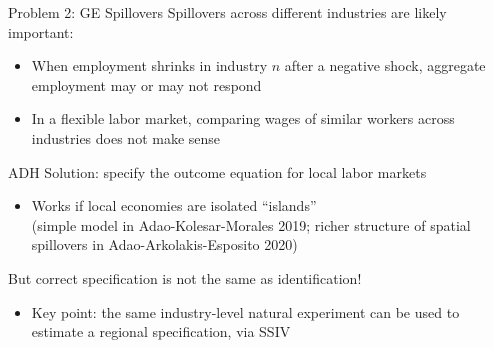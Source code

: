 \documentclass{beamer}
\begin{document}
\begin{frame}{Problem 2: GE Spillovers}
\vspace{-0.2cm}
Spillovers across different industries are likely important:
	\begin{itemize}
	\item When employment  shrinks in industry $n$ after a negative shock, aggregate employment may or may not respond
	\pause{}\smallskip
	\item In a flexible labor market, comparing wages of similar workers across industries does not make sense
	\pause{}\medskip
	\end{itemize}

ADH Solution: specify the outcome equation for local labor markets %
	\begin{itemize}
	\item Works if local economies are isolated ``islands'' \\(simple model in Adao-Kolesar-Morales 2019; richer structure of spatial spillovers in Adao-Arkolakis-Esposito 2020)
	\pause{}\medskip
	\end{itemize}

But correct specification is not the same as identification!
	\begin{itemize}
	\item Key point: the same industry-level natural experiment can be used to estimate a regional specification, via SSIV
	\end{itemize}
\end{frame}
\end{document}
